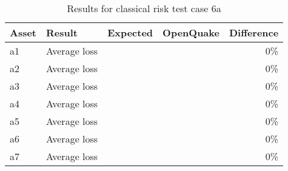 \begin{table}[htbp]

\centering
\begin{tabular}{ l l r r r }

\hline
\rowcolor{anti-flashwhite}
\bf{Asset} & \bf{Result} & \bf{Expected} & \bf{OpenQuake} & \bf{Difference}\\
\hline
a1 & Average loss &  &  & 0\% \\
a2 & Average loss &  &  & 0\% \\
a3 & Average loss &  &  & 0\% \\
a4 & Average loss &  &  & 0\% \\
a5 & Average loss &  &  & 0\% \\
a6 & Average loss &  &  & 0\% \\
a7 & Average loss &  &  & 0\% \\
\hline
\end{tabular}

\caption{Results for classical risk test case 6a}
\label{tab:result-classical-risk-6a}
\end{table}